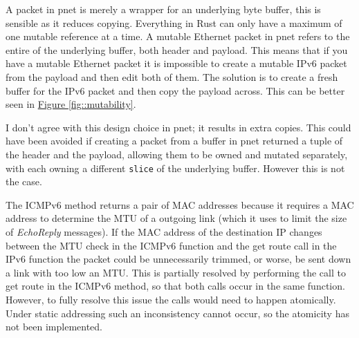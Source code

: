\documentclass[12pt,a4paper,twoside,openany]{report}
\begin{document}
A packet in pnet is merely a wrapper for an underlying byte buffer, this is sensible as it reduces copying.  Everything in Rust can only have a maximum of one mutable reference at a time.  A mutable Ethernet packet in pnet refers to the entire of the underlying buffer, both header and payload.  This means that if you have a mutable Ethernet packet it is impossible to create a mutable IPv6 packet from the payload and then edit both of them.  The solution is to create a fresh buffer for the IPv6 packet and then copy the payload across. This can be better seen in  \hyperref[fig::mutability]{Figure }\ref{fig::mutability}.

I don't agree with this design choice in pnet; it results in extra copies. This could have been avoided if creating a packet from a buffer in pnet returned a tuple of the header and the payload, allowing them to be owned and mutated separately, with each owning a different \verb!slice! of the underlying buffer.  However this is not the case. 

The ICMPv6 method returns a pair of MAC addresses because it requires a MAC address to determine the MTU of a outgoing link (which it uses to limit the size of \textit{EchoReply} messages).  If the MAC address of the destination IP changes between the MTU check in the ICMPv6 function and the get route call in the IPv6 function the packet could be unnecessarily trimmed, or worse, be sent down a link with too low an MTU. This is partially resolved by performing the call to get route in the ICMPv6 method, so that both calls occur in the same function. However, to fully resolve this issue the calls would need to happen atomically. Under static addressing such an inconsistency cannot occur, so the atomicity has not been implemented.
\end{document}
